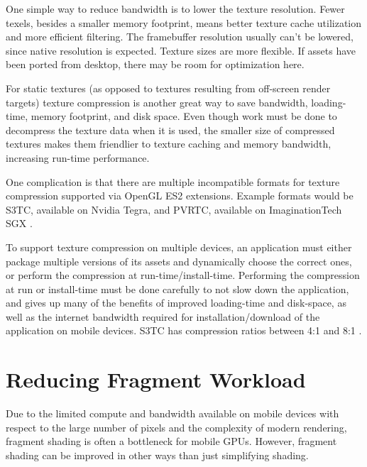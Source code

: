 
One simple way to reduce bandwidth is to lower the texture resolution.  Fewer
texels, besides a smaller memory footprint, means better texture cache
utilization and more efficient filtering.  The framebuffer resolution usually
can't be lowered, since native resolution is expected.  Texture sizes are more
flexible.  If assets have been ported from desktop, there may be room for
optimization here.


For static textures (as opposed to textures resulting from off-screen render
targets) texture compression is another great way to save bandwidth,
loading-time, memory footprint, and disk space.  Even though work must be done
to decompress the texture data when it is used, the smaller size of compressed
textures makes them friendlier to texture caching and memory bandwidth,
increasing run-time performance. 

One complication is that there are multiple incompatible formats for texture
compression supported via OpenGL ES2 extensions.  Example formats would be
S3TC, available on Nvidia Tegra, and PVRTC, available on ImaginationTech SGX
\cite{motorola_texture}.

To support texture compression on multiple devices, an application must either
package multiple versions of its assets and dynamically choose the correct
ones, or perform the compression at run-time/install-time.  Performing the
compression at run or install-time must be done carefully to not slow down the
application, and gives up many of the benefits of improved loading-time and
disk-space, as well as the internet bandwidth required for
installation/download of the application on mobile devices.  S3TC has
compression ratios between 4:1 and 8:1 \cite{arb_texture_compresssion}.

\section{Reducing Fragment Workload}
\label{Jon-McCaffrey-Reducing-Fragment-Workload}


Due to the limited compute and bandwidth available on mobile devices with
respect to the large number of pixels and the complexity of modern rendering,
fragment shading is often a bottleneck for mobile GPUs.  However, fragment
shading can be improved in other ways than just simplifying shading.

